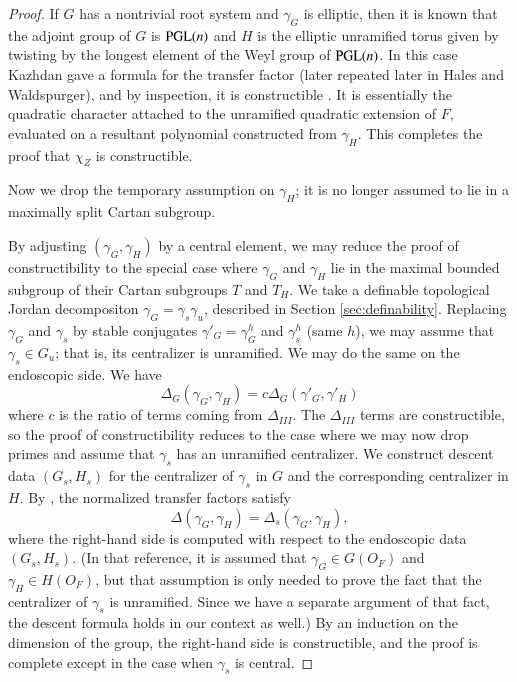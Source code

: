 \begin{proof}
If $G$ has a nontrivial root system and $\gamma_G$ is elliptic, then
it is known that the adjoint group of $G$ is ${\operatorname{PGL}}(n)$ and $H$ is
the elliptic unramified torus given by twisting by the longest element
of the Weyl group of ${\operatorname{PGL}}(n)$.  In this case Kazhdan gave a
formula for the transfer factor (later repeated later in Hales and
Waldspurger), and by inspection, it is constructible
\cite{kazhdan1983lifting}.  It is essentially the quadratic character
attached to the unramified quadratic extension of $F$, evaluated on a
resultant polynomial constructed from $\gamma_H$.  This completes the
proof that $\chi_Z$ is constructible.

Now we drop the temporary assumption on $\gamma_H$; it is no longer
assumed to lie in a maximally split Cartan subgroup.

By adjusting $(\gamma_G,\gamma_H)$ by a central element, we may reduce
the proof of constructibility to the special case where $\gamma_G$ and
$\gamma_H$ lie in the maximal bounded subgroup of their Cartan
subgroups $T$ and $T_H$.  We take a definable topological Jordan
decompositon $\gamma_G = \gamma_s \gamma_u$, described in Section
\ref{sec:definability}.  Replacing $\gamma_G$ and $\gamma_s$ by stable
conjugates $\gamma'_G=\gamma_G^h$ and $\gamma_s^h$ (same $h$), we may
assume that $\gamma_s\in G_u$; that is, its centralizer is unramified.
We may do the same on the endoscopic side.  We have
\[
\Delta_G(\gamma_G,\gamma_H) = c \Delta_G(\gamma'_G,\gamma'_H)
\]
where $c$ is the ratio of terms coming from $\Delta_{III}$.  The
$\Delta_{III}$ terms are constructible, so the proof of
constructibility reduces to the case where we may now drop primes and
assume that $\gamma_s$ has an unramified centralizer.  We construct
descent data $(G_s,H_s)$ for the centralizer of $\gamma_s$ in $G$ and
the corresponding centralizer in $H$.  By \cite{hales1993simple}, the
normalized transfer factors satisfy
\[
\Delta(\gamma_G,\gamma_H) = \Delta_s(\gamma_G,\gamma_H),
\]
where the right-hand side is computed with respect to the endoscopic
data $(G_s,H_s)$.  (In that reference, it is assumed that $\gamma_G\in
G(O_F)$ and $\gamma_H\in H(O_F)$, but that assumption is only needed
to prove the fact that the centralizer of $\gamma_s$ is unramified.
Since we have a separate argument of that fact, the descent formula
holds in our context as well.)  By an induction on the dimension of
the group, the right-hand side is constructible, and the proof is
complete except in the case when $\gamma_s$ is central.


\end{proof}
